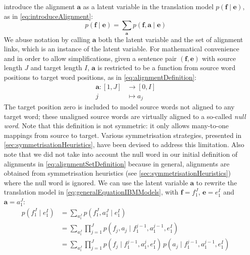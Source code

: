 %

\citet{brown-dellapietra-dellapietra-mercer-1993} introduce the
alignment $\bm{a}$ as a latent variable in the translation model
$p(\bm{f} \mid \bm{e})$, as in \autoref{eq:introduceAlignment}:
\begin{equation}
  p(\bm{f} \mid \bm{e}) = \sum_{\bm{a}} p(\bm{f}, \bm{a} \mid \bm{e})
  \label{eq:introduceAlignment}
\end{equation}
%
We abuse notation by calling $\bm{a}$ both the latent variable
and the set of alignment links, which is an instance of the latent
variable.
For mathematical convenience and in order to allow simplifications,
given a sentence pair $(\bm{f}, \bm{e})$ with source length
$J$ and target length $I$,
$\bm{a}$ is restricted to be a function from source word positions
to target word positions, as in \autoref{eq:alignmentDefinition}:
%
\begin{equation}
\begin{split}
  \bm{a} : [1, J] &\longrightarrow [0, I] \\
                j &\longmapsto a_j
\end{split}
\label{eq:alignmentDefinition}
\end{equation}
%
The target position zero is included to
model source words not aligned to any target word; these unaligned source words
are virtually aligned to a so-called \emph{null word}. Note that this definition
is not symmetric: it only allows many-to-one mappings from source to target.
Various symmetrisation strategies, presented in \autoref{sec:symmetrisationHeuristics},
have been devised to address this limitation.
Also note that we did not
take into account the null word in our initial definition of alignments
in \autoref{eq:alignmentSetDefinition} because in general, alignments
are obtained from symmetrisation heuristics
(see \autoref{sec:symmetrisationHeuristics}) where the null word
is ignored.
We can use the latent variable
$\bm{a}$ to rewrite the translation model in
\autoref{eq:generalEquationIBMModels}, with $\bm{f} = f_1^J$, $\bm{e} = e_1^I$
and $\bm{a} = a_1^J$:
%
\begin{equation}
  \begin{split}
    p(f_1^J \mid e_1^I) &= \sum_{a_1^J} p(f_1^J, a_1^J \mid e_1^I) \\
                        &= \sum_{a_1^J} \prod_{j = 1}^J p(f_j, a_j \mid f_1^{j - 1}, a_1^{j - 1}, e_1^I) \\
                        &= \sum_{a_1^J} \prod_{j = 1}^J p(f_j \mid f_1^{j - 1}, a_1^j, e_1^I) \, p(a_j \mid f_1^{j - 1}, a_1^{j - 1}, e_1^I) \\
  \end{split}
  \label{eq:generalEquationIBMModels}
\end{equation}
